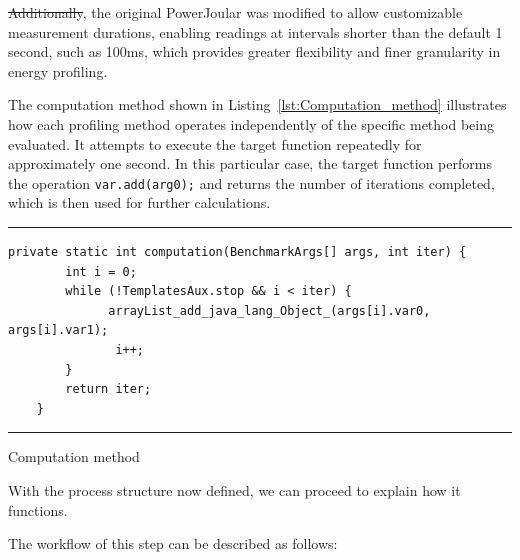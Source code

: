  \st{Additionally}, the original PowerJoular was modified to allow customizable measurement durations, enabling readings at intervals shorter than the default 1 second, such as 100ms, which provides greater flexibility and finer granularity in energy profiling.

The computation method shown in Listing~\ref{lst:Computation_method} illustrates how each profiling method operates independently of the specific method being evaluated. It attempts to execute the target function repeatedly for approximately one second. In this particular case, the target function performs the operation \texttt{var.add(arg0);} and returns the number of iterations completed, which is then used for further calculations.

\begin{listing}[H]
\noindent\rule{\linewidth}{0.4pt}
\begin{verbatim}
private static int computation(BenchmarkArgs[] args, int iter) {
        int i = 0;
        while (!TemplatesAux.stop && i < iter) {
              arrayList_add_java_lang_Object_(args[i].var0, args[i].var1);
               i++;
        }
        return iter;
    }
\end{verbatim}
\noindent\rule{\linewidth}{0.4pt}
\caption{Computation method}            
\label{lst:Computation_method}
\end{listing}


With the process structure now defined, we can proceed to explain how it functions.

The workflow of this step can be described as follows:



